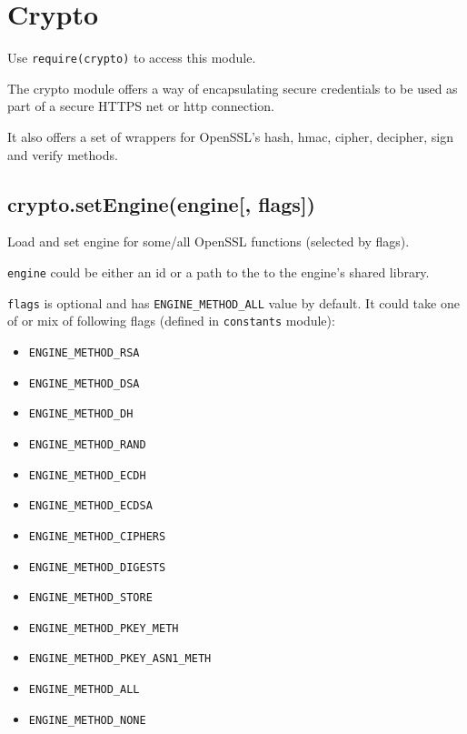 \section{Crypto}\label{crypto}

\begin{Shaded}
\begin{Highlighting}[]
 
     
\end{Highlighting}
\end{Shaded}

Use \texttt{require(\textquotesingle{}crypto\textquotesingle{})} to
access this module.

The crypto module offers a way of encapsulating secure credentials to be
used as part of a secure HTTPS net or http connection.

It also offers a set of wrappers for OpenSSL's hash, hmac, cipher,
decipher, sign and verify methods.

\subsection{crypto.setEngine(engine{[},
flags{]})}\label{crypto.setengineengine-flags}

Load and set engine for some/all OpenSSL functions (selected by flags).

\texttt{engine} could be either an id or a path to the to the engine's
shared library.

\texttt{flags} is optional and has \texttt{ENGINE\_METHOD\_ALL} value by
default. It could take one of or mix of following flags (defined in
\texttt{constants} module):

\begin{itemize}
\itemsep1pt\parskip0pt
\item
  \texttt{ENGINE\_METHOD\_RSA}
\item
  \texttt{ENGINE\_METHOD\_DSA}
\item
  \texttt{ENGINE\_METHOD\_DH}
\item
  \texttt{ENGINE\_METHOD\_RAND}
\item
  \texttt{ENGINE\_METHOD\_ECDH}
\item
  \texttt{ENGINE\_METHOD\_ECDSA}
\item
  \texttt{ENGINE\_METHOD\_CIPHERS}
\item
  \texttt{ENGINE\_METHOD\_DIGESTS}
\item
  \texttt{ENGINE\_METHOD\_STORE}
\item
  \texttt{ENGINE\_METHOD\_PKEY\_METH}
\item
  \texttt{ENGINE\_METHOD\_PKEY\_ASN1\_METH}
\item
  \texttt{ENGINE\_METHOD\_ALL}
\item
  \texttt{ENGINE\_METHOD\_NONE}
\end{itemize}


